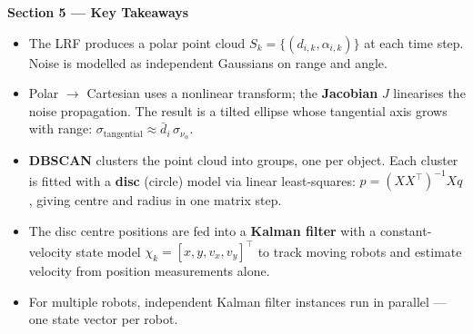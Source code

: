 \documentclass[12pt, a4paper]{article}
\begin{document}
\begin{keybox}
  \textbf{Section 5 --- Key Takeaways}
  \begin{itemize}[leftmargin=1.2em,itemsep=2pt]
    \item The LRF produces a polar point cloud
      $S_k = \{(d_{i,k}, \alpha_{i,k})\}$ at each time step.
      Noise is modelled as independent Gaussians on range and angle.
    \item Polar $\to$ Cartesian uses a nonlinear transform; the
      \textbf{Jacobian} $J$ linearises the noise propagation.
      The result is a tilted ellipse whose tangential axis grows with
      range: $\sigma_\text{tangential} \approx \bar{d}_i\,\sigma_{\nu_\alpha}$.
    \item \textbf{DBSCAN} clusters the point cloud into groups, one per
      object.  Each cluster is fitted with a \textbf{disc} (circle) model
      via linear least-squares: $p = (XX^\top)^{-1}Xq$, giving centre
      and radius in one matrix step.
    \item The disc centre positions are fed into a \textbf{Kalman filter}
      with a constant-velocity state model
      $\chi_k = [x, y, v_x, v_y]^\top$ to track moving robots and
      estimate velocity from position measurements alone.
    \item For multiple robots, independent Kalman filter instances run
      in parallel --- one state vector per robot.
  \end{itemize}
\end{keybox}
\end{document}
